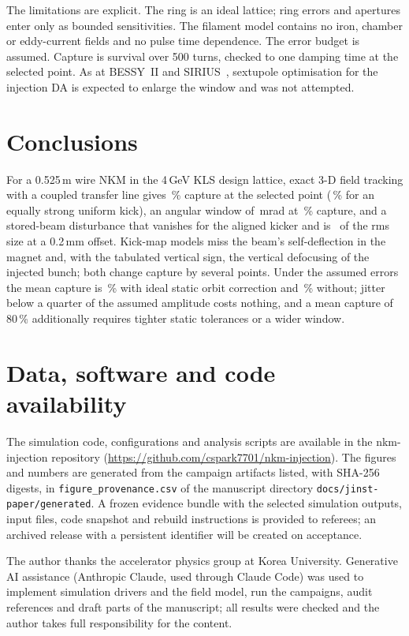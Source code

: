 \documentclass[a4paper,11pt]{article}
\begin{document}
The limitations are explicit. The ring is an ideal lattice; ring errors and apertures enter only as bounded sensitivities. The filament model contains no iron, chamber or eddy-current fields and no pulse time dependence. The error budget is assumed. Capture is survival over 500 turns, checked to one damping time at the selected point. As at BESSY~II and SIRIUS~\cite{Gora2023,Velloso2023}, sextupole optimisation for the injection DA is expected to enlarge the window and was not attempted.

\section{Conclusions}
\label{sec:conclusions}

For a 0.525\,m wire NKM in the 4\,GeV KLS design lattice, exact 3-D field tracking with a coupled transfer line gives \ValThreeD\,\% capture at the selected point (\ValDipole\,\% for an equally strong uniform kick), an angular window of \WinAngleWidth\,mrad at \WinThreshold\,\% capture, and a stored-beam disturbance that vanishes for the aligned kicker and is \TranspTwoAmp\ of the rms size at a 0.2\,mm offset. Kick-map models miss the beam's self-deflection in the magnet and, with the tabulated vertical sign, the vertical defocusing of the injected bunch; both change capture by several points. Under the assumed errors the mean capture is \RobCMean\,\% with ideal static orbit correction and \RobMean\,\% without; jitter below a quarter of the assumed amplitude costs nothing, and a mean capture of 80\,\% additionally requires tighter static tolerances or a wider window.

\section*{Data, software and code availability}

{\sloppy The simulation code, configurations and analysis scripts are available in the nkm-injection repository (\url{https://github.com/cspark7701/nkm-injection}). The figures and numbers are generated from the campaign artifacts listed, with SHA-256 digests, in \texttt{figure\_provenance.csv} of the manuscript directory \texttt{docs/\allowbreak jinst-paper/\allowbreak generated}. A frozen evidence bundle with the selected simulation outputs, input files, code snapshot and rebuild instructions is provided to referees; an archived release with a persistent identifier will be created on acceptance.\par}

\acknowledgments

The author thanks the accelerator physics group at Korea University. Generative AI assistance (Anthropic Claude, used through Claude Code) was used to implement simulation drivers and the field model, run the campaigns, audit references and draft parts of the manuscript; all results were checked and the author takes full responsibility for the content.



\end{document}
